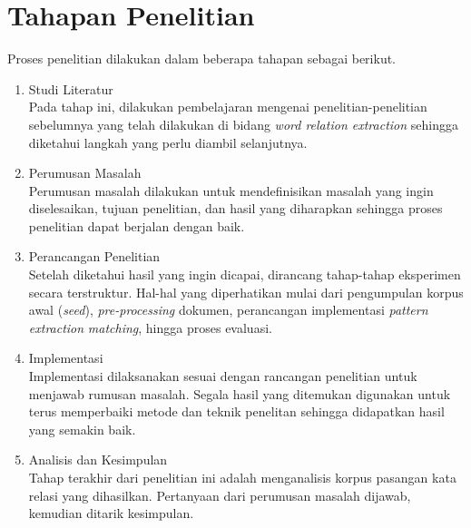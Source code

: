 \section{Tahapan Penelitian}
Proses penelitian dilakukan dalam beberapa tahapan sebagai berikut.
\begin{enumerate}
	\item Studi Literatur \\
	Pada tahap ini, dilakukan pembelajaran mengenai penelitian-penelitian sebelumnya yang telah dilakukan di bidang \textit{word relation extraction} sehingga diketahui langkah yang perlu diambil selanjutnya.
	\item Perumusan Masalah \\
	Perumusan masalah dilakukan untuk mendefinisikan masalah yang ingin diselesaikan, tujuan penelitian, dan hasil yang diharapkan sehingga proses penelitian dapat berjalan dengan baik.
	\item Perancangan Penelitian \\
	Setelah diketahui hasil yang ingin dicapai, dirancang tahap-tahap eksperimen secara terstruktur. Hal-hal yang diperhatikan mulai dari pengumpulan korpus awal (\textit{seed}), \textit{pre-processing} dokumen, perancangan implementasi \textit{pattern extraction} \textit{matching}, hingga proses evaluasi.
	\item Implementasi \\
	Implementasi dilaksanakan sesuai dengan rancangan penelitian untuk menjawab rumusan masalah. Segala hasil yang ditemukan digunakan untuk terus memperbaiki metode dan teknik penelitan sehingga didapatkan hasil yang semakin baik.
	\item Analisis dan Kesimpulan \\
	Tahap terakhir dari penelitian ini adalah menganalisis korpus pasangan kata relasi yang dihasilkan. Pertanyaan dari perumusan masalah dijawab, kemudian ditarik kesimpulan.
	
\end{enumerate}


